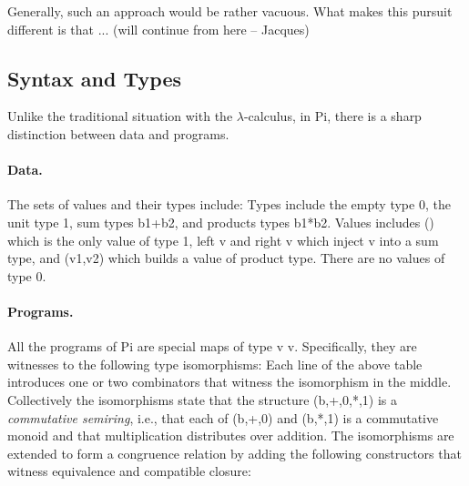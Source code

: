 \documentclass[preprint]{sigplanconf}
\begin{document}
Generally, such an approach would be rather vacuous.  What makes this
pursuit different is that ... (will continue from here -- Jacques)

\subsection{Syntax and Types} 
\label{sec:pi-syntax}

Unlike the traditional situation with the $\lambda$-calculus, in {{Pi}},
there is a sharp distinction between data and programs. 

\paragraph*{Data.} The sets of values and their types include:
Types include the empty type {{0}}, the unit type {{1}}, sum types {{b1+b2}},
and products types {{b1*b2}}.  Values includes {{()}} which is the only value
of type {{1}}, {{left v}} and {{right v}} which inject {{v}} into a sum type,
and {{(v1,v2)}} which builds a value of product type. There are no values of
type {{0}}.

\paragraph*{Programs.} All the programs of {{Pi}} are special maps of type
{{v \rightarrow v}}. Specifically, they are witnesses to the following type
isomorphisms:
Each line of the above table introduces one or two combinators that witness
the isomorphism in the middle. Collectively the isomorphisms state that the
structure {{(b,+,0,*,1)}} is a \emph{commutative semiring}, i.e., that each
of {{(b,+,0)}} and {{(b,*,1)}} is a commutative monoid and that
multiplication distributes over addition. The isomorphisms are extended to
form a congruence relation by adding the following constructors that witness
equivalence and compatible closure:
%
%
%
\end{document}
